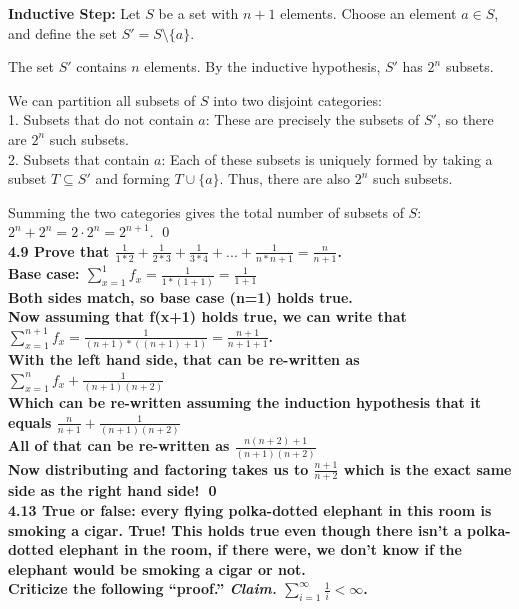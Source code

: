 \documentclass[12pt]{exam}
\begin{document}
\textbf{Inductive Step:}
Let $S$ be a set with $n + 1$ elements. Choose an element $a \in S$, and define the set $S' = S \setminus \{a\}$.

The set $S'$ contains $n$ elements. By the inductive hypothesis, $S'$ has $2^n$ subsets.

We can partition all subsets of $S$ into two disjoint categories:
\\1. Subsets that do not contain $a$: These are precisely the subsets of $S'$, so there are $2^n$ such subsets.
\\2. Subsets that contain $a$: Each of these subsets is uniquely formed by taking a subset $T \subseteq S'$ and forming $T \cup \{a\}$. Thus, there are also $2^n$ such subsets.

Summing the two categories gives the total number of subsets of $S$:
$2^n + 2^n = 2 \cdot 2^n = 2^{n+1}$. \qed
\\

\bf 4.9 Prove that $\frac{1}{1*2} + \frac{1}{2*3} + \frac{1}{3*4} + ... + \frac{1}{n*n+1} = \frac{n}{n+1}$.
\normalfont
\\Base case: $\sum_{x=1}^{1} f_x = \frac{1}{1*(1+1)} = \frac{1}{1+1}$
\\Both sides match, so base case (n=1) holds true.
\\Now assuming that f(x+1) holds true, we can write that $\sum_{x=1}^{n+1} f_x = \frac{1}{(n+1)*((n+1)+1)} = \frac{n+1}{n+1+1}$.
\\With the left hand side, that can be re-written as $\sum_{x=1}^{n} f_x + \frac{1}{(n+1)(n+2)}$
\\Which can be re-written assuming the induction hypothesis that it equals $\frac{n}{n+1} + \frac{1}{(n+1)(n+2)}$
\\All of that can be re-written as $\frac{n(n+2) + 1}{(n+1)(n+2)}$
\\Now distributing and factoring takes us to $\frac{n+1}{n+2}$ which is the exact same side as the right hand side! \qed
\\

\bf 4.13 True or false: every flying polka-dotted elephant in this room is smoking a cigar. 
\normalfont 
True! This holds true even though there isn't a polka-dotted elephant in the room, if there were, we don't know if the elephant would be smoking a cigar or not. 
\\

\bf Criticize the following ``proof.'' 
\normalfont
\textit{Claim.} $\sum_{i=1}^{\infty} \frac{1}{i} < \infty$. 
\end{document}
